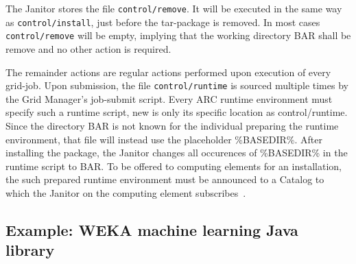 The Janitor stores the file \texttt{control/remove}. It will be executed in the same way as \texttt{control/install}, just
before the tar-package is removed. In most cases \texttt{control/remove} will be empty, implying that the working directory
\textdollar BAR shall be remove and no other action is required.

The remainder actions are regular actions performed upon execution of every grid-job. Upon submission,
the file \texttt{control/runtime} is sourced multiple times by the Grid Manager's job-submit script. Every
ARC runtime environment must specify such a runtime script, new is only its specific location as control/runtime.
Since the directory \textdollar BAR is not known for the individual preparing the runtime environment, that
file will instead use the placeholder \%BASEDIR\%.  After installing the package, the Janitor changes all
occurences of \%BASEDIR\% in the runtime script to \textdollar BAR.  To be offered to computing elements
for an installation, the such prepared runtime environment must be announced to a Catalog to which the
Janitor on the computing element subscribes~\cite[p. 10]{BAYER_2007}.


\subsection{Example: WEKA machine learning Java library}


